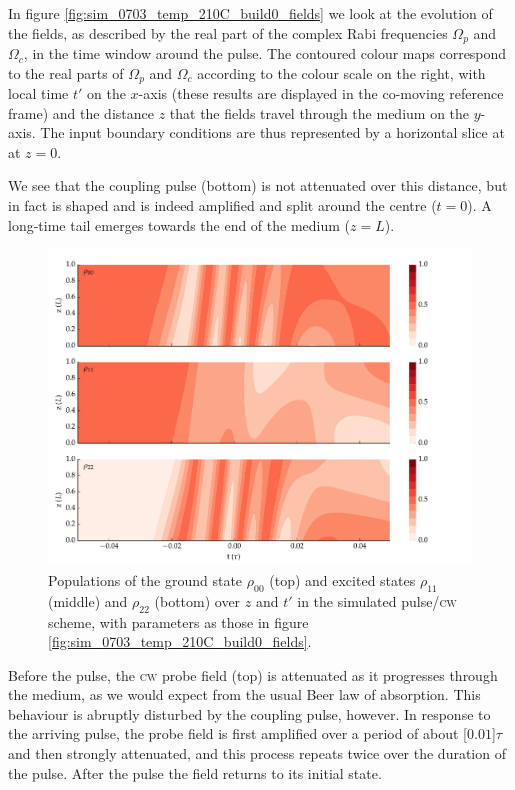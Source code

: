     In figure \ref{fig:sim_0703_temp_210C_build0_fields} we look at the
    evolution of the fields, as described by the real part of the complex Rabi
    frequencies $\Omega_p$ and $\Omega_c$, in the time window around the pulse.
    The contoured colour maps correspond to the real parts of $\Omega_p$ and
    $\Omega_c$ according to the colour scale on the right, with local time $t'$
    on the $x$-axis (these results are displayed in the co-moving reference
    frame) and the distance $z$ that the fields travel through the medium on the
    $y$-axis. The input boundary conditions are thus represented by a horizontal
    slice at at $z\!=\!0$.

    We see that the coupling pulse (bottom) is not attenuated over this
    distance, but in fact is shaped and is indeed amplified and split around the
    centre ($t=0$). A long-time tail emerges towards the end of the medium
    ($z\!=\!L$).

    \begin{figure}%
      \includegraphics[width=\linewidth]{figs/06_simultons/mb_vee2g_build0_15c_130p_0330t_230C_sb50_120vel000_00_002um_fig3.pdf}
      \caption{
      Populations of the ground state $\rho_{00}$ (top) and excited states
      $\rho_{11}$ (middle) and  $\rho_{22}$ (bottom) over $z$ and $t'$  in the
      simulated pulse/\textsc{cw} scheme, with parameters as those in figure
      \ref{fig:sim_0703_temp_210C_build0_fields}.
      }
      \label{fig:sim_0703_temp_210C_build0_pop}
    \end{figure}

    Before the pulse, the \textsc{cw} probe field (top) is attenuated as it
    progresses through the medium, as we would expect from the usual Beer law of
    absorption. This behaviour is abruptly disturbed by the coupling pulse,
    however. In response to the arriving pulse, the probe field is first
    amplified over a period of about \unit[$0.01$]{$\tau$} and then strongly
    attenuated, and this process repeats twice over the duration of the pulse.
    After the pulse the field returns to its initial state.

